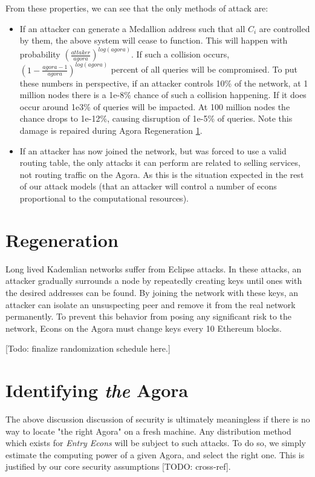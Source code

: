 \documentclass{article}
\begin{document}
From these properties, we can see that the only methods of attack are:

\begin{itemize}
    \item If an attacker can generate a Medallion address such that all $C_i$ are controlled by them, the above system will cease to function. This will happen with probability $(\frac{attaker}{agora})^{log(agora)}$. If such a collision occurs, $(1 - \frac{agora-1}{agora})^{log(agora)}$ percent of all queries will be compromised. To put these numbers in perspective, if an attacker controls 10\% of the network, at 1 million nodes there is a 1e-8\% chance of such a collision happening. If it does occur around 1e3\% of queries will be impacted. At 100 million nodes the chance drops to 1e-12\%, causing disruption of 1e-5\% of queries. Note this damage is repaired during Agora Regeneration \ref{agora-regen}.
    \item If an attacker has now joined the network, but was forced to use a valid routing table, the only attacks it can perform are related to selling services, not routing traffic on the Agora. As this is the situation expected in the rest of our attack models (that an attacker will control a number of econs proportional to the computational resources).
\end{itemize}

\section{Regeneration}
\label{agora-regen}

Long lived Kademlian networks suffer from Eclipse attacks. In these attacks, an attacker gradually surrounds a node by repeatedly creating keys until ones with the desired addresses can be found. By joining the network with these keys, an attacker can isolate an unsuspecting peer and remove it from the real network permanently. To prevent this behavior from posing any significant risk to the network, Econs on the Agora must change keys every 10 Ethereum blocks.

[Todo: finalize randomization schedule here.]

\section{Identifying \emph{the} Agora}

The above discussion discussion of security is ultimately meaningless if there is no way to locate "the right Agora" on a fresh machine. Any distribution method which exists for \emph{Entry Econs} will be subject to such attacks. To do so, we simply estimate the computing power of a given Agora, and select the right one. This is justified by our core security assumptions [TODO: cross-ref].
\end{document}
